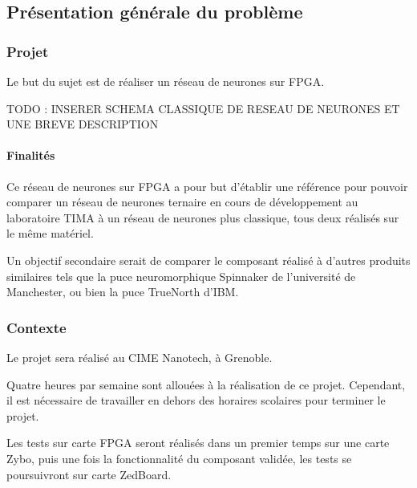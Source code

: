 
\subsection{Présentation générale du problème}

\subsubsection{Projet}
Le but du sujet est de réaliser un réseau de neurones sur FPGA.

TODO : INSERER SCHEMA CLASSIQUE DE RESEAU DE NEURONES ET UNE BREVE DESCRIPTION

\paragraph{Finalités\\}

Ce réseau de neurones sur FPGA a pour but d'établir une référence pour pouvoir
comparer un réseau de neurones ternaire en cours de développement au laboratoire
TIMA à un réseau de neurones plus classique, tous deux réalisés sur le même 
matériel.

Un objectif secondaire serait de comparer le composant réalisé à d'autres
produits similaires tels que la puce neuromorphique Spinnaker de l'université
de Manchester, ou bien la puce TrueNorth d'IBM.

\subsubsection{Contexte}

Le projet sera réalisé au CIME Nanotech, à Grenoble. 

Quatre heures par semaine sont allouées à la réalisation de ce projet. Cependant,
il est nécessaire de travailler en dehors des horaires scolaires pour terminer 
le projet.

Les tests sur carte FPGA seront réalisés dans un premier temps sur une carte Zybo,
puis une fois la fonctionnalité du composant validée, les tests se poursuivront 
sur carte ZedBoard.

